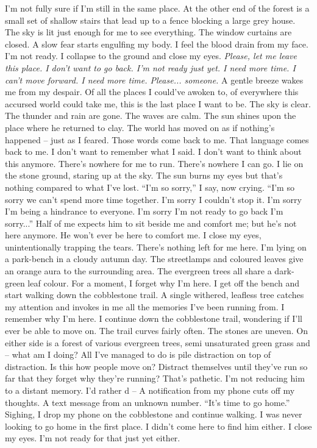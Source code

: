 \documentclass[a4paper, 12pt]{book}
\newcommand\tab[1][1cm]{\hspace*{#1}}
\begin{document}
\newline
\tab
I’m not fully sure if I’m still in the same place.  At the other end of the forest is a small set of shallow stairs that lead up to a fence blocking a large grey house. The sky is lit just enough for me to see everything. The window curtains are closed. A slow fear starts engulfing my body. I feel the blood drain from my face. I’m not ready. I collapse to the ground and close my eyes. \textit{Please, let me leave this place. I don’t want to go back. I’m not ready just yet. I need more time. I can’t move forward. I need more time. Please... someone.}
\newline
\tab
A gentle breeze wakes me from my despair. Of all the places I could’ve awoken to, of everywhere this accursed world could take me, this is the last place I want to be. The sky is clear. The thunder and rain are gone. The waves are calm. The sun shines upon the place where he returned to clay. The world has moved on as if nothing’s happened -- just as I feared. Those words come back to me. That language comes back to me. I don’t want to remember what I said. I don’t want to think about this anymore. There’s nowhere for me to run. There’s nowhere I can go. I lie on the stone ground, staring up at the sky. The sun burns my eyes but that’s nothing compared to what I’ve lost. ``I’m so sorry,'' I say, now crying. ``I’m so sorry we can’t spend more time together. I’m sorry I couldn’t stop it. I’m sorry I’m being a hindrance to everyone. I’m sorry I’m not ready to go back I’m sorry...'' Half of me expects him to sit beside me and comfort me; but he’s not here anymore. He won’t ever be here to comfort me. I close my eyes, unintentionally trapping the tears. There’s nothing left for me here.
\newline
\tab
I’m lying on a park-bench in a cloudy autumn day. The streetlamps and coloured leaves give an orange aura to the surrounding area. The evergreen trees all share a dark-green leaf colour. For a moment, I forget why I’m here. I get off the bench and start walking down the cobblestone trail. A single withered, leafless tree catches my attention and invokes in me all the memories I’ve been running from. I remember why I’m here. I continue down the cobblestone trail, wondering if I’ll ever be able to move on. The trail curves fairly often. The stones are uneven. On either side is a forest of various evergreen trees, semi unsaturated green grass and -- what am I doing? All I’ve managed to do is pile distraction on top of distraction. Is this how people move on? Distract themselves until they’ve run so far that they forget why they’re running? That’s pathetic. I’m not reducing him to a distant memory. I’d rather d -- A notification from my phone cuts off my thoughts. A text message from an unknown number. ``It’s time to go home.'' Sighing, I drop my phone on the cobblestone and continue walking. I was never looking to go home in the first place. I didn’t come here to find him either. I close my eyes. I’m not ready for that just yet either.
\end{document}
